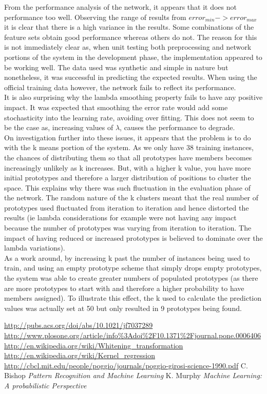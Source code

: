 \documentclass[twocolumn]{article}
\begin{document}
From the performance analysis of the network, it appears that it does not performance too well. Observing the range of
results from $error_{min} -> error_{max}$ it is clear that there is a high variance in the results. Some combinations of the
feature sets obtain good performance whereas others do not. The reason for this is not immediately clear as, when unit testing
both preprocessing and network portions of the system in the development phase, the implementation appeared to be working well.
The data used was synthetic and simple in nature but nonetheless, it was successful in predicting the expected results. When using the
official training data however, the network fails to reflect its performance. \\
It is also surprising why the lambda smoothing property fails to have any positive impact. It was expected that smoothing the error
rate would add some stochasticity into the learning rate, avoiding over fitting. This does not seem to be the case as, increasing values
of $\lambda$, causes the performance to degrade.\\
On investigation further into these issues, it appears that the problem is to do with the k means portion of the system. As we only have
38 training instances, the chances of distributing them so that all prototypes have members becomes increasingly unlikely as k increases.
But, with a higher k value, you have more initial prototypes and therefore a larger distribution of positions to cluster the space.
This explains why there was such fluctuation in the evaluation phase of the network. The random nature of the k clusters meant that the 
real number of prototypes used fluctuated from iteration to iteration and hence distorted the results (ie lambda considerations for example
 were not having any impact because the number of prototypes was varying from iteration to iteration. The impact of having reduced or 
 increased prototypes is believed to dominate over the lambda variations).\\
As a work around, by increasing k past the number of instances being used to train, and using an empty prototype scheme that simply drops empty
prototypes, the system was able to create greater numbers of populated prototypes (as there are more prototypes to start with and therefore
a higher probability to have members assigned). To illustrate this effect, the k used to calculate the prediction
values was actually set at 50 but only resulted in 9 prototypes being found. 

\begin{thebibliography}{9}
 \url{http://pubs.acs.org/doi/abs/10.1021/jf7037289}
 \url{http://www.plosone.org/article/info%3Adoi%2F10.1371%2Fjournal.pone.0006406}
 \url{http://en.wikipedia.org/wiki/Whitening_transformation}
 \url{http://en.wikipedia.org/wiki/Kernel_regression}
 \url{http://cbcl.mit.edu/people/poggio/journals/poggio-girosi-science-1990.pdf}
 C. Bishop \emph{Pattern Recognition and Machine Learning}
 K. Murphy \emph{Machine Learning: A probabilistic Perspective}
\end{thebibliography}
\end{document}
